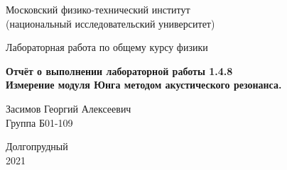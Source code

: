 
\usepackage[T2A]{fontenc}			%
\usepackage[utf8]{inputenc}			%
\usepackage[english,russian]{babel}	%
\usepackage{tikz}
\usepackage{pgfplots}


\usepackage{amsmath,amsfonts,amssymb,amsthm,mathtools} 


\usepackage{wasysym}



\begin{titlepage}

    \newpage
    \begin{center}
        \normalsize Московский физико-технический институт \\(национальный исследовательский университет)
    \end{center}

    \vspace{6em}

    \begin{center}
        \Large Лабораторная работа по общему курсу физики\\
    \end{center}

    \vspace{1em}

    \begin{center}
        \Large \textbf{Отчёт о выполнении лабораторной работы 1.4.8\\ {Измерение модуля Юнга методом акустического резонанса.}}
    \end{center}

    \vspace{2em}

    \begin{center}
        \large Засимов Георгий Алексеевич \\
        Группа Б01-109
    \end{center}

    \vspace{\fill}

    \begin{center}
    Долгопрудный \\2021
    \end{center}
    
\end{titlepage}

\newpage

